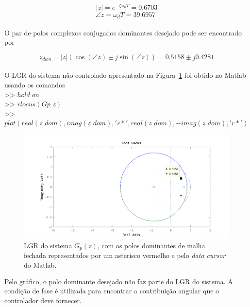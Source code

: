 \documentclass{article}
\begin{document}
        \[ |z| = e^{-\zeta\omega_nT} = 0.6703 \]
        \[ \angle z = \omega_dT = 39.6957^\circ \]\\

        {O par de polos complexos conjugados dominantes desejado pode ser
            encontrado por}

        \[ z_{dom} = |z|\left(\cos(\angle z) \pm j\sin(\angle z)\right) = 0.5158 \pm j0.4281 \]\\

        {O LGR do sistema não controlado apresentado na Figura~\ref{fig:q2_lgr_descontrolado}
            foi obtido no Matlab usando os comandos\\
        >> $ hold \; on $\\
        >> $ rlocus(Gp\_z) $\\
        >> $ plot(real(z\_dom),imag(z\_dom),'r*',real(z\_dom),-imag(z\_dom),'r*') $ }\\

        \begin{figure}[H]
           \centering
                \includegraphics[width=1\linewidth]{images/q2_rlocus_uncontrolled.png}
                \caption{LGR do sistema $G_p(z)$, com os polos dominantes de
                    malha fechada representados por um asterisco vermelho e pelo
                    \textit{data cursor} do Matlab.}
                \label{fig:q2_lgr_descontrolado}
        \end{figure}

        {Pelo gráfico, o polo dominante desejado não faz parte do LGR do sistema.
            A condição de fase é utilizada para encontrar a contribuição angular
            que o controlador deve fornecer.}
\end{document}
